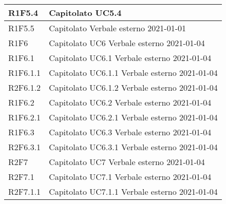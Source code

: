 \begin{center}
\begin{longtable}{|p{22mm}|p{22mm}|}
	\hline
R1F5.4	& 
	Capitolato \newline
	UC5.4	
	\\
	\hline
R1F5.5	& 
	Capitolato \newline	
	Verbale esterno 2021-01-01
	\\
	\hline
R1F6	& 
		Capitolato \newline
		UC6 \newline
		Verbale esterno 2021-01-04\\
	\hline
R1F6.1	&
		Capitolato \newline
		UC6.1 \newline
		Verbale esterno 2021-01-04
	\\
\hline
R1F6.1.1	& 
	Capitolato \newline
	UC6.1.1 \newline
	Verbale esterno 2021-01-04
\\
\hline
R2F6.1.2	& 
	Capitolato \newline
	UC6.1.2 \newline
	Verbale esterno 2021-01-04
\\

	\hline
R1F6.2	& 
		Capitolato \newline
		UC6.2 \newline
		Verbale esterno 2021-01-04
	\\
	\hline
R1F6.2.1	& 
	Capitolato \newline
	UC6.2.1 \newline
	Verbale esterno 2021-01-04
\\
\hline
R1F6.3	&
	Capitolato \newline
	UC6.3 \newline
	Verbale esterno 2021-01-04
\\
\hline
R2F6.3.1	& 
	Capitolato \newline
	UC6.3.1 \newline
	Verbale esterno 2021-01-04
\\
	\hline
R2F7	& 
		Capitolato \newline
		UC7 \newline
		Verbale esterno 2021-01-04
	\\
	\hline
R2F7.1	&
	Capitolato \newline
	UC7.1 \newline
	Verbale esterno 2021-01-04
\\
\hline
R2F7.1.1	& 
	Capitolato \newline
	UC7.1.1 \newline
	Verbale esterno 2021-01-04
\\


\end{longtable}
\end{center}
